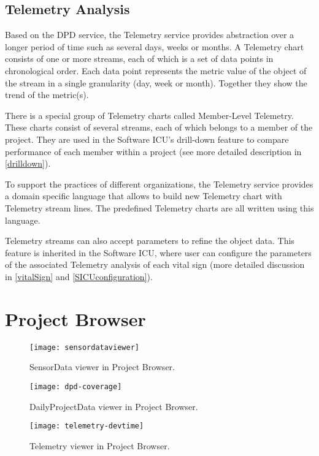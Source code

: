 \subsection{Telemetry Analysis}
Based on the DPD service, the Telemetry service provides abstraction over a longer period of time such as several days, weeks or months. A Telemetry chart consists of one or more streams, each of which is a set of data points in chronological order. Each data point represents the metric value of the object of the stream in a single granularity (day, week or month). Together they show the trend of the metric(s).

There is a special group of Telemetry charts called Member-Level Telemetry. These charts consist of several streams, each of which belongs to a member of the project. They are used in the Software ICU's drill-down feature to compare performance of each member within a project (see more detailed description in \autoref{drilldown}).

To support the practices of different organizations, the Telemetry service provides a domain specific language that allows to build new Telemetry chart with Telemetry stream lines. The predefined Telemetry charts are all written using this language.

Telemetry streams can also accept parameters to refine the object data. This feature is inherited in the Software ICU, where user can configure the parameters of the associated Telemetry analysis of each vital sign (more detailed discussion in \autoref{vitalSign} and \autoref{SICUconfiguration}).

\section {Project Browser}
\begin{figure}[htbp] %
   \centering
   \texttt{[image: sensordataviewer]}
   \caption{SensorData viewer in Project Browser.}
   \label{fig:sensordata}
\end{figure}

\begin{figure}[htbp] %
   \centering
   \texttt{[image: dpd-coverage]}
   \caption{DailyProjectData viewer in Project Browser.}
   \label{fig:dpd}
\end{figure}

\begin{figure}[htbp] %
   \centering
   \texttt{[image: telemetry-devtime]}
   \caption{Telemetry viewer in Project Browser.}
   \label{fig:telemetry}
\end{figure}

